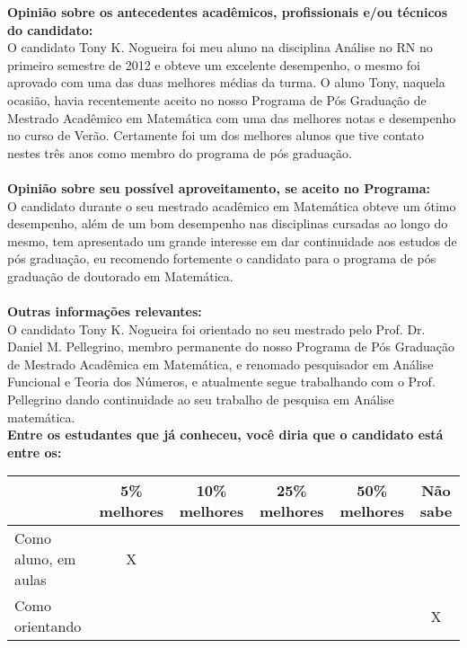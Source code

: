 \documentclass[11pt]{article}
\begin{document}
\textbf{Opinião sobre os antecedentes acadêmicos, profissionais e/ou técnicos do candidato:}
\\O candidato Tony K. Nogueira foi meu aluno na disciplina Análise no RN no primeiro semestre de 2012 e obteve um excelente desempenho, o mesmo foi aprovado com uma das  duas melhores médias da turma. O aluno Tony, naquela ocasião, havia recentemente aceito no nosso Programa de Pós Graduação de Mestrado Acadêmico em Matemática com uma das melhores notas e desempenho no curso de Verão. Certamente foi um dos melhores alunos que tive contato nestes três anos como membro do programa de pós graduação.\\
\\
\textbf{Opinião sobre seu possível aproveitamento, se aceito no Programa:}
\\O candidato durante o seu mestrado acadêmico em Matemática obteve um ótimo desempenho, além de um bom desempenho nas disciplinas cursadas ao longo do mesmo, tem apresentado um grande interesse em dar continuidade aos estudos de pós graduação, eu recomendo fortemente o candidato para o programa de pós graduação de doutorado em Matemática. \\ 
\\
\textbf{Outras informações relevantes:} \\O candidato Tony K. Nogueira foi orientado no seu mestrado pelo Prof. Dr. Daniel M. Pellegrino, membro permanente do nosso Programa de Pós Graduação de Mestrado Acadêmica em Matemática, e renomado pesquisador em Análise Funcional e Teoria dos Números, e atualmente segue trabalhando com o Prof. Pellegrino dando continuidade ao seu trabalho de pesquisa em Análise matemática.
\\[0.3cm]
\textbf{Entre os estudantes que já conheceu, você diria que o candidato está entre os:}
\\
\begin{tabular}{|l|c|c|c|c|c|}
\hline
 & 5\% melhores & 10\% melhores & 25\% melhores & 50\% melhores & Não sabe \\
\hline
Como aluno, em aulas & X &  &  &  & \\
\hline
Como orientando &  &  &  &  & X\\
\hline
\end{tabular}
\end{document}
